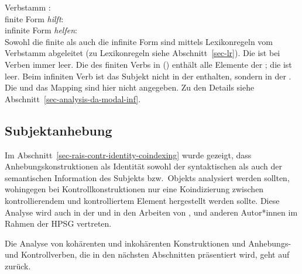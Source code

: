 {
\ea
Verbstamm :\\
\z 
\eas
finite Form \emph{hilft}:\\
\zs
\ea
infinite Form \emph{helfen}:\\
\z
Sowohl die finite als auch die infinite Form sind mittels Lexikonregeln vom Verbstamm abgeleitet
(zu Lexikonregeln siehe Abschnitt~\ref{sec-lr}). Die \sprl ist bei Verben immer leer. Die \compsl des finiten Verbs in () enthält alle Elemente der \argstl; die \subjl
ist leer. Beim infiniten Verb ist das Subjekt nicht in der \compsl enthalten, sondern in der
\subjl. Die \argstl und das Mapping sind hier nicht angegeben. Zu den Details siehe Abschnitt~\ref{sec-analysis-da-modal-inf}.


\subsection{Subjektanhebung}
\label{sec-subjektanhebung-anal}

Im Abschnitt~\ref{sec-rais-contr-identity-coindexing} wurde gezeigt,
dass Anhebungskonstruktionen als Identität sowohl der syntaktischen
als auch der semantischen Information des Subjekts bzw.\ Objekts analysiert werden
sollten, wohingegen bei Kontrollkonstruktionen nur eine Koindizierung
zwischen kontrollierendem und kontrolliertem Element hergestellt werden sollte.
Diese Analyse wird auch in der \lfg
\parencites{Andrews82b}{Neidle82a}[]{Bresnan82c}
und in den Arbeiten von \citet[Kapitel~7]{ps2}, \citet[160]{Kiss95a}
und anderen Autor*innen im Rahmen der HPSG vertreten.

Die Analyse von kohärenten und inkohärenten Konstruktionen und Anhebungs- und
Kontrollverben, die in den nächsten Abschnitten präsentiert wird,
geht auf \citet{Kiss95a} zurück. 

}
